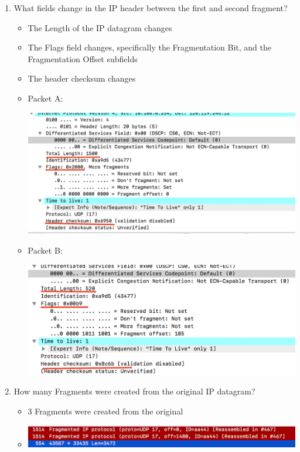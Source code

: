 \documentclass{article}
\begin{document}
\begin{enumerate}
      \item What fields change in the IP header between the first and second fragment?
        \begin{itemize}
          \item The Length of the IP datagram changes
          \item The Flags field changes, specifically the Fragmentation Bit, and the Fragmentation Offset subfields
          \item The header checksum changes
          \item Packet A:\par\includegraphics[scale=0.5]{images/IP13a.png}
          \item Packet B:\par\includegraphics[scale=0.5]{images/IP13b.png}

        \end{itemize}

      \item How many Fragments were created from the original IP datagram?
        \begin{itemize}
          \item 3 Fragments were created from the original
          \item \includegraphics[scale=0.5]{images/IP14.png}
        \end{itemize}


\end{enumerate}
\end{document}
